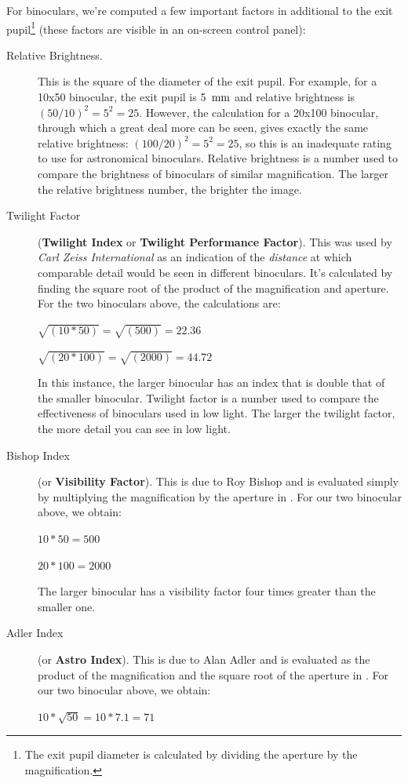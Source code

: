 For binoculars, we're computed a few important factors in additional to the exit pupil\footnote{The exit pupil diameter is calculated by dividing the aperture by the magnification.} (these factors are visible in an on-screen control panel):
\begin{description}
\item[Relative Brightness.] This is the square of the diameter of the exit pupil. 
For example, for a 10x50 binocular, the exit pupil is 5 $\,\mathrm{mm}$ and relative brightness 
is $(50/10)^2=5^2=25$. However, the calculation for a 20x100 binocular, through which 
a great deal more can be seen, gives exactly the same relative brightness: $(100/20)^2=5^2=25$, 
so this is an inadequate rating to use for astronomical binoculars. Relative brightness 
is a number used to compare the brightness of binoculars of similar magnification. 
The larger the relative brightness number, the brighter the image. 
\item[Twilight Factor] (\textbf{Twilight Index} or \textbf{Twilight Performance Factor}). 
This was used by \textit{Carl Zeiss International} as an indication of the \textit{distance} 
at which comparable detail would be seen in different binoculars. It's calculated by 
finding the square root of the product of the magnification and aperture. For the 
two binoculars above, the calculations are:

\begin{center}
$\sqrt{(10*50)}=\sqrt{(500)}=22.36$

$\sqrt{(20*100)}=\sqrt{(2000)}=44.72$
\end{center}

In this instance, the larger binocular has an index that is double that of the smaller 
binocular. Twilight factor is a number used to compare the effectiveness of binoculars 
used in low light. The larger the twilight factor, the more detail you can see in low 
light. 
\item[Bishop Index] (or \textbf{Visibility Factor}). This is due to Roy Bishop \citep{Bishop:2002} 
and is evaluated simply by multiplying the magnification by the aperture in \mm. For 
our two binocular above, we obtain:

\begin{center}
$10*50=500$

$20*100=2000$
\end{center}

The larger binocular has a visibility factor four times greater than the smaller one.
\item[Adler Index] (or \textbf{Astro Index}). This is due to Alan Adler \citep{Adler:2002} and 
is evaluated as the product of the magnification and the square root of the aperture in \mm.
For our two binocular above, we obtain:
\begin{center}
$10*\sqrt{50}=10*7.1=71$


\end{center}
\end{description}
